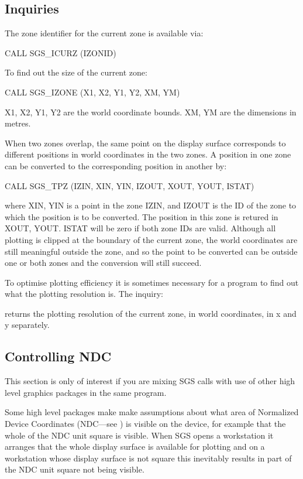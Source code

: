 \documentclass[11pt]{starlink}
\begin{document}
\subsection {Inquiries}

The zone identifier for the current zone is available via:
\begin{terminalv}
CALL SGS_ICURZ (IZONID)
\end{terminalv}
To find out the size of the current zone:
\begin{terminalv}
CALL SGS_IZONE (X1, X2, Y1, Y2, XM, YM)
\end{terminalv}
X1, X2, Y1, Y2 are the world coordinate bounds.  XM, YM
are the dimensions in metres.

When two zones overlap, the same point on the display surface corresponds to
different positions in world coordinates in the two zones. A position in one
zone can be converted to the corresponding position in another by:
\begin{terminalv}
CALL SGS_TPZ (IZIN, XIN, YIN, IZOUT, XOUT, YOUT, ISTAT)
\end{terminalv}
where XIN, YIN is a point in the zone IZIN, and IZOUT is the ID of the zone to
which the position is to be converted.  The position in this zone is retured
in XOUT, YOUT. ISTAT will be zero if both zone IDs are valid.  Although all
plotting is clipped at the boundary of the current zone, the world coordinates
are still meaningful outside the zone, and so the point to be converted can
be outside one or both zones and the conversion will still succeed.

To optimise plotting efficiency it is sometimes
necessary for a program to find out what the
plotting resolution is.  The inquiry:
\begin{terminalv}
CALL SGS_IDUN (DXW, DYW)}
\end{terminalv}
returns the plotting resolution of the current zone, in
world coordinates, in x and y separately.

\subsection {Controlling NDC}

This section is only of interest if you are mixing SGS calls with use of other
high level graphics packages in the same program.

Some high level packages make make assumptions about what area of Normalized
Device Coordinates (NDC---see
) is visible on the
device, for example that the whole of the NDC unit square is visible. When SGS
opens a workstation it arranges that the whole display surface is available for
plotting and on a workstation whose display surface is not square  this
inevitably results in part of the NDC unit square not being visible.
\end{document}
